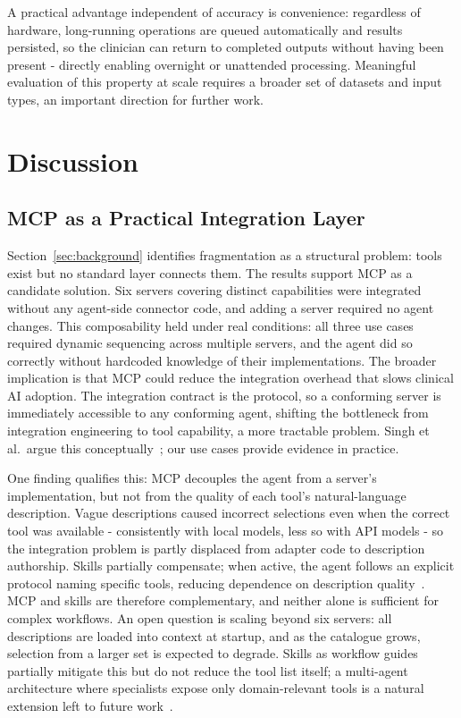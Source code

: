 \documentclass[conference]{IEEEtran}
\begin{document}
A practical advantage independent of accuracy is convenience: regardless of hardware, long-running operations are queued automatically and results persisted, so the clinician can return to completed outputs without having been present - directly enabling overnight or unattended processing. Meaningful evaluation of this property at scale requires a broader set of datasets and input types, an important direction for further work.

\section{Discussion}

\subsection{MCP as a Practical Integration Layer}
Section~\ref{sec:background} identifies fragmentation as a structural problem: tools exist but no standard layer connects them. The results support MCP as a candidate solution. Six servers covering distinct capabilities were integrated without any agent-side connector code, and adding a server required no agent changes. This composability held under real conditions: all three use cases required dynamic sequencing across multiple servers, and the agent did so correctly without hardcoded knowledge of their implementations. The broader implication is that MCP could reduce the integration overhead that slows clinical AI adoption. The integration contract is the protocol, so a conforming server is immediately accessible to any conforming agent, shifting the bottleneck from integration engineering to tool capability, a more tractable problem. Singh et al.\ argue this conceptually~\cite{mcp-aditi}; our use cases provide evidence in practice.

One finding qualifies this: MCP decouples the agent from a server's implementation, but not from the quality of each tool's natural-language description. Vague descriptions caused incorrect selections even when the correct tool was available - consistently with local models, less so with API models - so the integration problem is partly displaced from adapter code to description authorship. Skills partially compensate; when active, the agent follows an explicit protocol naming specific tools, reducing dependence on description quality~\cite{agentskillslargelanguage}. MCP and skills are therefore complementary, and neither alone is sufficient for complex workflows. An open question is scaling beyond six servers: all descriptions are loaded into context at startup, and as the catalogue grows, selection from a larger set is expected to degrade. Skills as workflow guides partially mitigate this but do not reduce the tool list itself; a multi-agent architecture where specialists expose only domain-relevant tools is a natural extension left to future work~\cite{klang2026orchestrated}.
\end{document}

